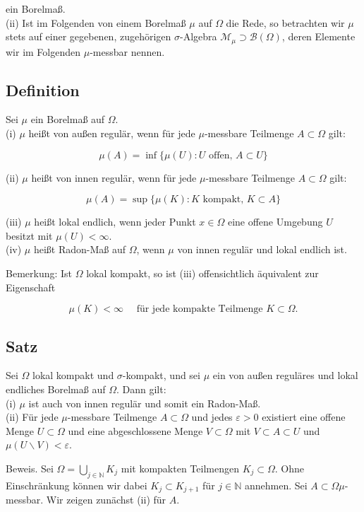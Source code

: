 \documentclass[10pt, letterpaper]{article}
\begin{document}
ein Borelmaß.\\
(ii) Ist im Folgenden von einem Borelmaß $\mu$ auf $\Omega$ die Rede, so betrachten wir $\mu$ stets auf einer gegebenen, zugehörigen $\sigma$-Algebra $\mathcal{M}_{\mu} \supset \mathcal{B}(\Omega)$, deren Elemente wir im Folgenden $\mu$-messbar nennen.

\subsection*{Definition}
Sei $\mu$ ein Borelmaß auf $\Omega$.\\
(i) $\mu$ heißt von außen regulär, wenn für jede $\mu$-messbare Teilmenge $A \subset \Omega$ gilt:

$$
\mu(A)=\inf \{\mu(U): U \text { offen, } A \subset U\}
$$

(ii) $\mu$ heißt von innen regulär, wenn für jede $\mu$-messbare Teilmenge $A \subset \Omega$ gilt:

$$
\mu(A)=\sup \{\mu(K): K \text { kompakt, } K \subset A\}
$$

(iii) $\mu$ heißt lokal endlich, wenn jeder Punkt $x \in \Omega$ eine offene Umgebung $U$ besitzt mit $\mu(U)<\infty$.\\
(iv) $\mu$ heißt Radon-Maß auf $\Omega$, wenn $\mu$ von innen regulär und lokal endlich ist.

Bemerkung: Ist $\Omega$ lokal kompakt, so ist (iii) offensichtlich äquivalent zur Eigenschaft

$$
\mu(K)<\infty \quad \text { für jede kompakte Teilmenge } K \subset \Omega .
$$

\subsection*{Satz}
Sei $\Omega$ lokal kompakt und $\sigma$-kompakt, und sei $\mu$ ein von außen reguläres und lokal endliches Borelmaß auf $\Omega$. Dann gilt:\\
(i) $\mu$ ist auch von innen regulär und somit ein Radon-Maß.\\
(ii) Für jede $\mu$-messbare Teilmenge $A \subset \Omega$ und jedes $\varepsilon>0$ existiert eine offene Menge $U \subset \Omega$ und eine abgeschlossene Menge $V \subset \Omega$ mit $V \subset A \subset U$ und $\mu(U \backslash V)<\varepsilon$.

Beweis. Sei $\Omega=\bigcup_{j \in \mathbb{N}} K_{j}$ mit kompakten Teilmengen $K_{j} \subset \Omega$. Ohne Einschränkung können wir dabei $K_{j} \subset K_{j+1}$ für $j \in \mathbb{N}$ annehmen. Sei $A \subset \Omega \mu$-messbar. Wir zeigen zunächst (ii) für $A$.
\end{document}
